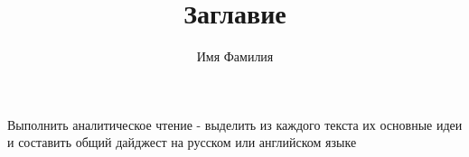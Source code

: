 \documentclass[10pt,a4paper]{article}
\author{Имя Фамилия}
\title{Заглавие}
\begin{document}
\maketitle
Выполнить аналитическое чтение - выделить из каждого текста их основные идеи и составить общий дайджест на русском или английском языке
\end{document}
